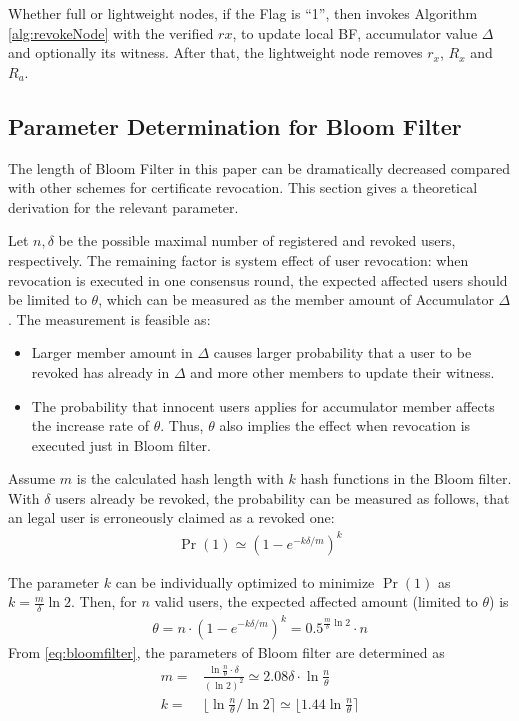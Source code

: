 \documentclass[conference]{IEEEtran}
\begin{document}
Whether full or lightweight nodes, if the Flag is ``1'', then invokes Algorithm \ref{alg:revokeNode} with the verified $rx$, to update local BF, accumulator value $\Delta$ and optionally its witness.
After that, the lightweight node removes $r_x$, $R_x$ and $R_a$.

\subsection{Parameter Determination for Bloom Filter} \label{section:parameter}

The length of Bloom Filter in this paper can be dramatically decreased compared with other schemes for certificate revocation. This section gives a theoretical derivation for the relevant parameter.

Let $n, \delta$ be the possible maximal number of registered and revoked users, respectively. The remaining factor is system effect of user revocation: when revocation is executed in one consensus round, the expected affected users should be limited to $\theta$, which can be measured as the member amount of Accumulator $\Delta$. The measurement is feasible as:
\begin{itemize}
    \item Larger member amount in $\Delta$ causes larger probability that a user to be revoked has already in $\Delta$ and more other members to update their witness.
    \item The probability that innocent users applies for accumulator member affects the increase rate of $\theta$. Thus, $\theta$ also implies the effect when revocation is executed just in Bloom filter.
\end{itemize}

Assume $m$ is the calculated hash length with $k$ hash functions in the Bloom filter. With $\delta$ users already be revoked, the probability can be measured as follows, that an legal user is erroneously claimed as a revoked one: 
\begin{align} 
    \Pr(1) \simeq (1 - e^{-k\delta/m})^k 
 \end{align}

The parameter $k$ can be individually optimized to minimize $\Pr(1)$ as $ k = \frac{m}{\delta}\ln 2$. Then, for $n$ valid users, the expected affected amount (limited to $\theta$) is 
\begin{align}\label{eq:bloomfilter}
    \theta = n \cdot (1 - e^{-k\delta/m})^{k} = 0.5^{\frac{m}{\delta}\ln 2}\cdot n
\end{align}
From \eqref{eq:bloomfilter}, the parameters of Bloom filter are determined as 
\begin{align}
m = & \frac{\ln \frac{n}{\theta} \cdot \delta}{(\ln 2)^2} \simeq 2.08\delta \cdot\ln \frac{n}{\theta}\\
k = & \lfloor \ln \frac{n}{\theta} / \ln 2 \rceil \simeq \lfloor 1.44 \ln \frac{n}{\theta} \rceil
\end{align}
\end{document}
